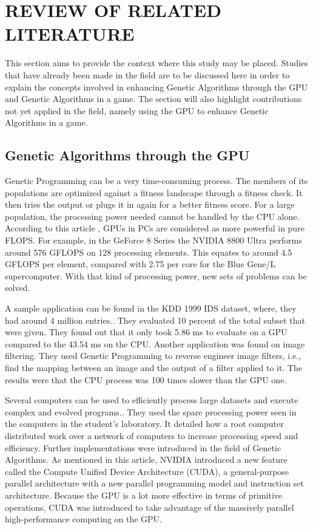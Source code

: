 \chapter{REVIEW OF RELATED LITERATURE}

This section aims to provide the context where this study may be placed. 
Studies that have already been made in the field are to be discussed here in order to 
explain the concepts involved in enhancing Genetic Algorithms through the GPU and 
Genetic Algorithms in a game. The section will also highlight contributions not yet 
applied in the field, namely using the GPU to enhance Genetic Algorithms in a game.

\section{Genetic Algorithms through the GPU}

Genetic Programming can be a very time-consuming process.  The members of its populations are optimized against a fitness landscape through a fitness check.  
It then tries the output or plugs it in again for a better fitness score. For a large population, the processing power needed cannot be handled by the CPU alone.  
According to this article , GPUs in PCs are considered as more powerful in pure FLOPS\cite{Banzhaf09}.  For example, in the GeForce 8 Series the NVIDIA 8800 Ultra performs around 576 GFLOPS 
on 128 processing elements.  This equates to around 4.5 GFLOPS per element, compared with 2.75 per core for the Blue Gene/L supercomputer.  With that kind of processing power, 
new sets of problems can be solved.  

A sample application can be found in the KDD 1999 IDS dataset, where, they had around 4 million entries.\cite{Banzhaf09}.  They evaluated 10 percent of the total subset that were given.  They 
found out that it only took 5.86 ms to evaluate on a GPU compared to the 43.54 ms on the CPU.  Another application was found on image filtering.  
They used Genetic Programming to reverse engineer image filters, i.e., find the mapping between an image and the output of a filter applied to it.  The results were that the CPU process 
was 100 times slower than the GPU one.  

Several computers can be used to efficiently process large datasets and execute complex and evolved programs.\cite{Harding09}.  
They used the spare processing power seen in the computers in the student's laboratory.  It detailed how a root computer distributed work over a network of computers to increase processing speed and efficiency.
Further implementations were introduced in the field of Genetic Algorithms.  As mentioned in this article, NVIDIA introduced a new feature called the Compute Unified Device Architecture (CUDA), 
a general-purpose parallel architecture with a new parallel programming model and instruction set architecture\cite{Zhang09}.  Because the GPU is a lot more effective in terms of primitive operations, 
CUDA was introduced to take advantage of the massively parallel high-performance computing on the GPU.  

